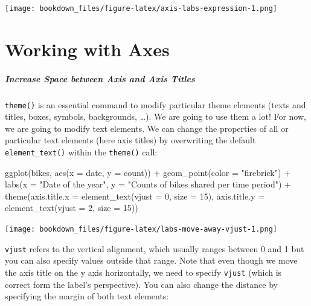 \documentclass[
]{krantz}
\makeatletter
\newenvironment{Shaded}{\begin{snugshade}}{\end{snugshade}}
\newcommand{\AttributeTok}[1]{\textcolor[rgb]{0.61,0.61,0.61}{#1}}
\newcommand{\DecValTok}[1]{\textcolor[rgb]{0.06,0.06,0.06}{#1}}
\newcommand{\FunctionTok}[1]{\textcolor[rgb]{0,0,0}{#1}}
\newcommand{\NormalTok}[1]{#1}
\newcommand{\SpecialCharTok}[1]{\textcolor[rgb]{0,0,0}{#1}}
\newcommand{\StringTok}[1]{\textcolor[rgb]{0.5,0.5,0.5}{#1}}
\newenvironment{kframe}{%
\medskip{}
\setlength{\fboxsep}{.8em}
 \def\at@end@of@kframe{}%
 \ifinner\ifhmode%
  \def\at@end@of@kframe{\end{minipage}}%
  \begin{minipage}{\columnwidth}%
 \fi\fi%
 \def\FrameCommand##1{\hskip\@totalleftmargin \hskip-\fboxsep
 \colorbox{shadecolor}{##1}\hskip-\fboxsep
     \hskip-\linewidth \hskip-\@totalleftmargin \hskip\columnwidth}%
 \MakeFramed {\advance\hsize-\width
   \@totalleftmargin\z@ \linewidth\hsize
   \@setminipage}}%
 {\par\unskip\endMakeFramed%
 \at@end@of@kframe}
\renewenvironment{Shaded}{\begin{kframe}}{\end{kframe}}
\makeatother
\begin{document}
\texttt{[image: bookdown\_files/figure-latex/axis-labs-expression-1.png]}

\hypertarget{axes}{%
\chapter{Working with Axes}\label{axes}}

\hypertarget{increase-space-between-axis-and-axis-titles}{%
\paragraph{Increase Space between Axis and Axis Titles}\label{increase-space-between-axis-and-axis-titles}}

\texttt{theme()} is an essential command to modify particular theme elements (texts and titles, boxes, symbols, backgrounds, \ldots). We are going to use them a lot! For now, we are going to modify text elements. We can change the properties of all or particular text elements (here axis titles) by overwriting the default \texttt{element\_text()} within the \texttt{theme()} call:

\begin{Shaded}
\begin{Highlighting}[]
\FunctionTok{ggplot}\NormalTok{(bikes, }\FunctionTok{aes}\NormalTok{(}\AttributeTok{x =}\NormalTok{ date, }\AttributeTok{y =}\NormalTok{ count)) }\SpecialCharTok{+}
  \FunctionTok{geom\_point}\NormalTok{(}\AttributeTok{color =} \StringTok{"firebrick"}\NormalTok{) }\SpecialCharTok{+}
  \FunctionTok{labs}\NormalTok{(}\AttributeTok{x =} \StringTok{"Date of the year"}\NormalTok{, }
       \AttributeTok{y =} \StringTok{"Counts of bikes shared per time period"}\NormalTok{) }\SpecialCharTok{+}
  \FunctionTok{theme}\NormalTok{(}\AttributeTok{axis.title.x =} \FunctionTok{element\_text}\NormalTok{(}\AttributeTok{vjust =} \DecValTok{0}\NormalTok{, }\AttributeTok{size =} \DecValTok{15}\NormalTok{),}
        \AttributeTok{axis.title.y =} \FunctionTok{element\_text}\NormalTok{(}\AttributeTok{vjust =} \DecValTok{2}\NormalTok{, }\AttributeTok{size =} \DecValTok{15}\NormalTok{))}
\end{Highlighting}
\end{Shaded}

\texttt{[image: bookdown\_files/figure-latex/labs-move-away-vjust-1.png]}

\texttt{vjust} refers to the vertical alignment, which usually ranges between 0 and 1 but you can also specify values outside that range. Note that even though we move the axis title on the y axis horizontally, we need to specify \texttt{vjust} (which is correct form the label's perspective). You can also change the distance by specifying the margin of both text elements:
\end{document}
